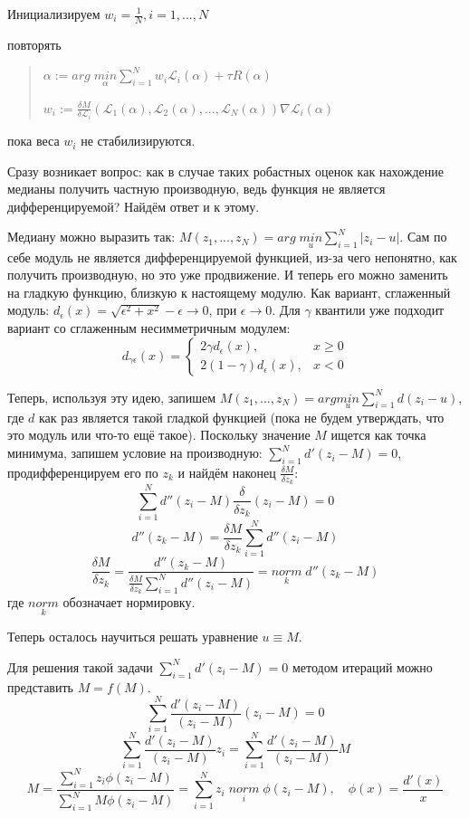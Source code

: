 Инициализируем $w_i = \frac{1}{N}, i = 1,...,N$

повторять
\begin{quote}
    $\alpha := arg \; \underset{\alpha}{min} \sum_{i=1}^N w_i \mathscr{L}_i(\alpha) + \tau R(\alpha)$\

    $w_i := \frac{\delta M}{\delta \mathscr{L}_i}(\mathscr{L}_1(\alpha), \mathscr{L}_2(\alpha), ..., \mathscr{L}_N(\alpha)) \nabla \mathscr{L}_i(\alpha)$
\end{quote}

пока веса $w_i$ не стабилизируются.

Сразу возникает вопрос: как в случае таких робастных оценок как нахождение медианы получить частную производную, ведь функция не является дифференцируемой? Найдём ответ и к этому.

Медиану можно выразить так: $M(z_1, ..., z_N) = arg \; \underset{u}{min} \sum_{i=1}^N |z_i - u|$. Сам по себе модуль не является дифференцируемой функцией, из-за чего непонятно, как получить производную, но это уже продвижение. И теперь его можно заменить на гладкую функцию, близкую к настоящему модулю. Как вариант, сглаженный модуль: $d_{\epsilon}(x) = \sqrt{\epsilon ^ 2 + x^ 2} - \epsilon \xrightarrow{} 0$, при $\epsilon \xrightarrow{} 0$.
Для $\gamma$ квантили уже подходит вариант со сглаженным несимметричным модулем:
\[
    d_{\gamma \epsilon}(x)=
    \begin{cases}
        2\gamma d_{\epsilon}(x),       & x \geq 0 \\
        2(1 - \gamma) d_{\epsilon}(x), & x < 0
    \end{cases}
\]

Теперь, используя эту идею, запишем $M(z_1, ..., z_N) =  arg \underset{u}{min} \sum_{i=1}^N d(z_i - u)$, где $d$ как раз является такой гладкой функцией (пока не будем утверждать, что это модуль или что-то ещё такое). Поскольку значение $M$ ищется как точка минимума, запишем условие на производную: $\sum_{i=1}^N d'(z_i - M) = 0$, продифференцируем его по $z_k$ и найдём наконец $\frac{\delta M}{\delta z_k}$:
$$\sum_{i=1}^Nd''(z_i - M) \frac{\delta}{\delta z_k} (z_i - M) = 0$$
$$d''(z_k - M) = \frac{\delta M}{\delta z_k} \sum_{i=1}^Nd''(z_i - M)$$
$$\frac{\delta M}{\delta z_k} = \frac{d''(z_k - M)}{\frac{\delta M}{\delta z_k} \sum_{i=1}^Nd''(z_i - M)} = \underset{k}{norm} \; d''(z_k - M)$$
где $\underset{k}{norm}$ обозначает нормировку.

Теперь осталось научиться решать уравнение $u \equiv M$.

Для решения такой задачи $\sum_{i=1}^Nd'(z_i - M) = 0$ методом итераций можно представить $M = f(M)$.
$$\sum_{i=1}^N \frac{d'(z_i - M)}{(z_i - M)} (z_i - M) = 0$$
$$\sum_{i=1}^N \frac{d'(z_i - M)}{(z_i - M)} z_i = \sum_{i=1}^N \frac{d'(z_i - M)}{(z_i - M)} M$$
$$M = \frac{\sum_{i=1}^N z_i \phi(z_i - M)}{\sum_{i=1}^N M \phi(z_i - M)} = \sum_{i=1}^N z_i \; \underset{i}{norm} \; \phi(z_i - M), \quad \phi(x) = \frac{d'(x)}{x}$$

